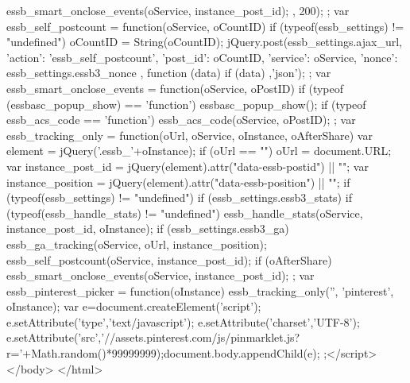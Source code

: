 {{{essb_smart_onclose_events(oService, instance_post_id); } }, 200); }; var essb_self_postcount = function(oService, oCountID) { if (typeof(essb_settings) != "undefined") { oCountID = String(oCountID); jQuery.post(essb_settings.ajax_url, { 'action': 'essb_self_postcount', 'post_id': oCountID, 'service': oService, 'nonce': essb_settings.essb3_nonce }, function (data) { if (data) { }},'json'); } }; var essb_smart_onclose_events = function(oService, oPostID) { if (typeof (essbasc_popup_show) == 'function') { essbasc_popup_show(); } if (typeof essb_acs_code == 'function') { essb_acs_code(oService, oPostID); } }; var essb_tracking_only = function(oUrl, oService, oInstance, oAfterShare) { var element = jQuery('.essb_'+oInstance); if (oUrl == "") { oUrl = document.URL; } var instance_post_id = jQuery(element).attr("data-essb-postid") || ""; var instance_position = jQuery(element).attr("data-essb-position") || ""; if (typeof(essb_settings) != "undefined") { if (essb_settings.essb3_stats) { if (typeof(essb_handle_stats) != "undefined") { essb_handle_stats(oService, instance_post_id, oInstance); } } if (essb_settings.essb3_ga) { essb_ga_tracking(oService, oUrl, instance_position); } } essb_self_postcount(oService, instance_post_id); if (oAfterShare) { essb_smart_onclose_events(oService, instance_post_id); } }; var essb_pinterest_picker = function(oInstance) { essb_tracking_only('', 'pinterest', oInstance); var e=document.createElement('script'); e.setAttribute('type','text/javascript'); e.setAttribute('charset','UTF-8'); e.setAttribute('src','//assets.pinterest.com/js/pinmarklet.js?r='+Math.random()*99999999);document.body.appendChild(e); };</script>
</body>
</html>
